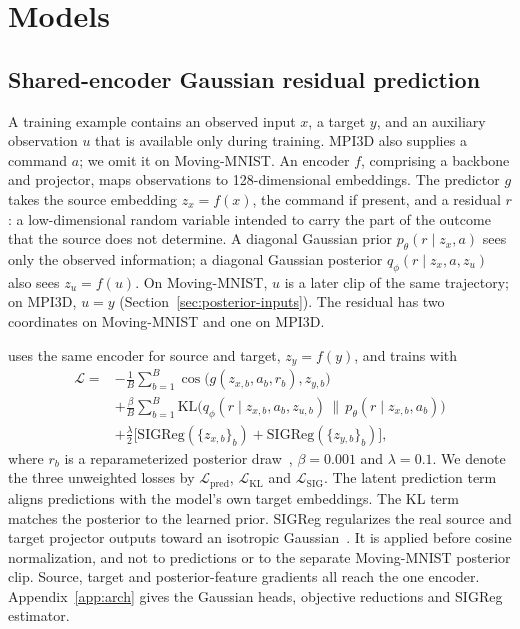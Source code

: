 \section{Models}
\label{sec:models}

\subsection{Shared-encoder Gaussian residual prediction}
\label{sec:notation}
\label{sec:s1}

A training example contains an observed input $x$, a target $y$, and an auxiliary observation $u$ that is available only during training. MPI3D also supplies a command $a$; we omit it on Moving-MNIST. An encoder $f$, comprising a backbone and projector, maps observations to 128-dimensional embeddings. The predictor $g$ takes the source embedding $z_x=f(x)$, the command if present, and a residual $r$: a low-dimensional random variable intended to carry the part of the outcome that the source does not determine. A diagonal Gaussian prior $p_\theta(r\mid z_x,a)$ sees only the observed information; a diagonal Gaussian posterior $q_\phi(r\mid z_x,a,z_u)$ also sees $z_u=f(u)$. On Moving-MNIST, $u$ is a later clip of the same trajectory; on MPI3D, $u=y$ (Section~\ref{sec:posterior-inputs}). The residual has two coordinates on Moving-MNIST and one on MPI3D.

\shvar{} uses the same encoder for source and target, $z_y=f(y)$, and trains with
\begin{equation}
\label{eq:s1}
\begin{aligned}
\mathcal L ={}& -\frac1B\sum_{b=1}^{B}\cos\!\big(g(z_{x,b},a_b,r_b),z_{y,b}\big)\\
&+\frac{\beta}{B}\sum_{b=1}^{B}\mathrm{KL}\!\big(q_\phi(r\mid z_{x,b},a_b,z_{u,b})\,\big\|\,p_\theta(r\mid z_{x,b},a_b)\big)\\
&+\frac{\lambda}{2}\big[\mathrm{SIGReg}(\{z_{x,b}\}_b)+\mathrm{SIGReg}(\{z_{y,b}\}_b)\big],
\end{aligned}
\end{equation}
where $r_b$ is a reparameterized posterior draw~\citep{kingma2014vae}, $\beta=0.001$ and $\lambda=0.1$. We denote the three unweighted losses by $\mathcal L_{\mathrm{pred}}$, $\mathcal L_{\mathrm{KL}}$ and $\mathcal L_{\mathrm{SIG}}$. The latent prediction term aligns predictions with the model's own target embeddings. The KL term matches the posterior to the learned prior. SIGReg regularizes the real source and target projector outputs toward an isotropic Gaussian~\citep{balestriero2025lejepa,maes2026lewm}. It is applied before cosine normalization, and not to predictions or to the separate Moving-MNIST posterior clip. Source, target and posterior-feature gradients all reach the one encoder. Appendix~\ref{app:arch} gives the Gaussian heads, objective reductions and SIGReg estimator.

